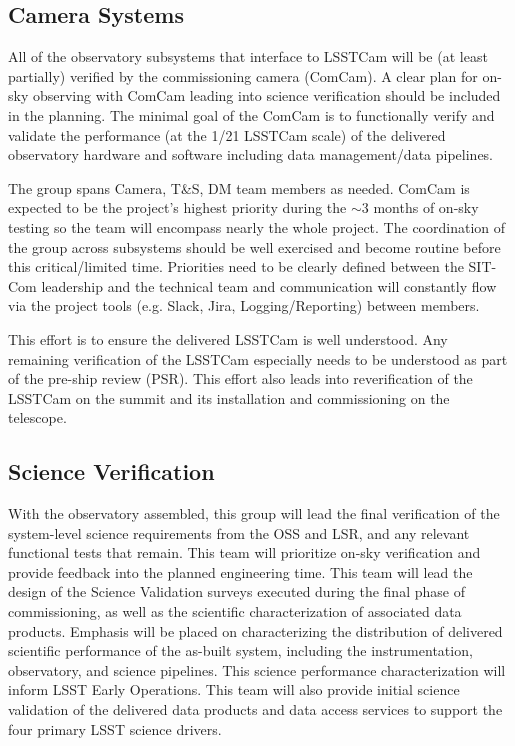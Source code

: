 \documentclass[SE,lsstdraft,authoryear,toc]{lsstdoc}
\begin{document}
\subsection{Camera Systems}
All of the observatory subsystems that interface to LSSTCam will be (at least partially) verified by the commissioning camera (ComCam).
A clear plan for on-sky observing with ComCam leading into science verification should be included in the planning.
The minimal goal of the ComCam is to functionally verify and validate the performance (at the 1/21 LSSTCam scale) of the delivered observatory hardware and software including data management/data pipelines.

The group spans Camera, T\&S, DM team members as needed.
ComCam is expected to be the project’s highest priority during the $\sim$3 months of on-sky testing so the team will encompass nearly the whole project.
The coordination of the group across subsystems should be well exercised and become routine before this critical/limited time.
Priorities need to be clearly defined between the SIT-Com leadership and the technical team and communication will constantly flow via the project tools (e.g. Slack, Jira, Logging/Reporting) between members.

This effort is to ensure the delivered LSSTCam is well understood.
Any remaining verification of the LSSTCam especially needs to be understood as part of the pre-ship review (PSR).
This effort also leads into reverification of the LSSTCam on the summit and its installation and commissioning on the telescope.

\subsection{Science Verification}
With the observatory assembled, this group will lead the final verification of the system-level science requirements from the OSS and LSR, and any relevant functional tests that remain.
This team will prioritize on-sky verification and provide feedback into the planned engineering time.
This team will lead the design of the Science Validation surveys executed during the final phase of commissioning, as well as the scientific characterization of associated data products.
Emphasis will be placed on characterizing the distribution of delivered scientific performance of the as-built system, including the instrumentation, observatory, and science pipelines.
This science performance characterization will inform LSST Early Operations.
This team will also provide initial science validation of the delivered data products and data access services to support the four primary LSST science drivers.
\end{document}
